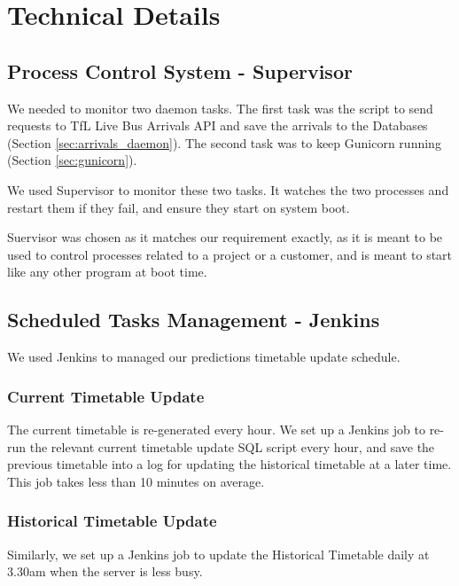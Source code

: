 \chapter{Technical Details}


\section{Process Control System - Supervisor}
\par We needed to monitor two daemon tasks. The first task was the script to send requests to TfL Live Bus Arrivals API and save the arrivals to the Databases (Section \ref{sec:arrivals_daemon}). The second task was to keep Gunicorn running (Section \ref{sec:gunicorn}).

\par We used Supervisor\cite{supervisor} to monitor these two tasks. It watches the two processes and restart them if they fail, and ensure they start on system boot.

\par Suervisor was chosen as it matches our requirement exactly, as it is meant to be used to control processes related to a project or a customer, and is meant to start like any other program at boot time.

\section{Scheduled Tasks Management - Jenkins}
\par We used Jenkins\cite{jenkins} to managed our predictions timetable update schedule.


\subsection{Current Timetable Update}
\par The current timetable is re-generated every hour. We set up a Jenkins job to re-run the relevant current timetable update SQL script every hour, and save the previous timetable into a log for updating the historical timetable at a later time. This job takes less than 10 minutes on average.

\subsection{Historical Timetable Update}
\par Similarly, we set up a Jenkins job to update the Historical Timetable daily at 3.30am when the server is less busy.

